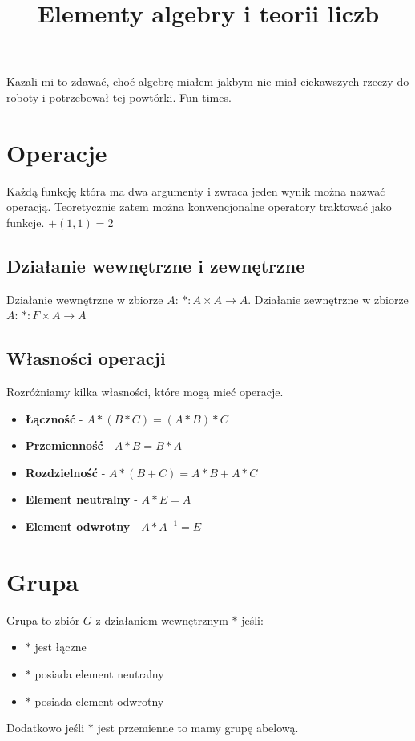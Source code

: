 \documentclass{../notatki}
\title{Elementy algebry i teorii liczb}
\begin{document}
\tableofcontents

\noindent Kazali mi to zdawać, choć algebrę miałem jakbym nie miał ciekawszych
rzeczy do roboty i potrzebował tej powtórki. Fun times.

\section{Operacje}

Każdą funkcję która ma dwa argumenty i zwraca jeden wynik można nazwać
operacją. Teoretycznie zatem można konwencjonalne operatory traktować jako
funkcje. $+(1, 1)=2$

\subsection{Działanie wewnętrzne i zewnętrzne}

Działanie wewnętrzne w zbiorze $A$: $*: A \times A \rightarrow A$.
Działanie zewnętrzne w zbiorze $A$: $*: F \times A \rightarrow A$

\subsection{Własności operacji}

Rozróżniamy kilka własności, które mogą mieć operacje.

\begin{itemize}
  \item \textbf{Łączność} - $A * (B * C) = (A * B) * C$
  \item \textbf{Przemienność} - $A * B = B * A$
  \item \textbf{Rozdzielność} - $A * (B + C) = A * B + A * C$
  \item \textbf{Element neutralny} - $A * E = A$
  \item \textbf{Element odwrotny} - $A * A^{-1} = E$
\end{itemize}

\section{Grupa}

Grupa to zbiór $G$ z działaniem wewnętrznym $*$ jeśli:
\begin{itemize}
  \item $*$ jest łączne
  \item $*$ posiada element neutralny
  \item $*$ posiada element odwrotny
\end{itemize}
Dodatkowo jeśli $*$ jest przemienne to mamy grupę abelową.
\end{document}
